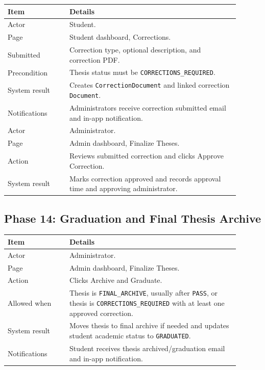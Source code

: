 \documentclass[11pt,a4paper]{article}
\newcommand{\status}[1]{\texttt{#1}}
\newcommand{\code}[1]{\texttt{#1}}
\begin{document}
\begin{longtable}{p{0.24\linewidth} p{0.66\linewidth}}
\toprule
\textbf{Item} & \textbf{Details} \\
\midrule
Actor & Student. \\
Page & Student dashboard, Corrections. \\
Submitted & Correction type, optional description, and correction PDF. \\
Precondition & Thesis status must be \status{CORRECTIONS\_REQUIRED}. \\
System result & Creates \code{CorrectionDocument} and linked correction \code{Document}. \\
Notifications & Administrators receive correction submitted email and in-app notification. \\
\midrule
Actor & Administrator. \\
Page & Admin dashboard, Finalize Theses. \\
Action & Reviews submitted correction and clicks Approve Correction. \\
System result & Marks correction approved and records approval time and approving administrator. \\
\bottomrule
\end{longtable}

\newpage

\subsection{Phase 14: Graduation and Final Thesis Archive}

\begin{longtable}{p{0.24\linewidth} p{0.66\linewidth}}
\toprule
\textbf{Item} & \textbf{Details} \\
\midrule
Actor & Administrator. \\
Page & Admin dashboard, Finalize Theses. \\
Action & Clicks Archive and Graduate. \\
Allowed when & Thesis is \status{FINAL\_ARCHIVE}, usually after \status{PASS}, or thesis is \status{CORRECTIONS\_REQUIRED} with at least one approved correction. \\
System result & Moves thesis to final archive if needed and updates student academic status to \status{GRADUATED}. \\
Notifications & Student receives thesis archived/graduation email and in-app notification. \\
\bottomrule
\end{longtable}
\end{document}
